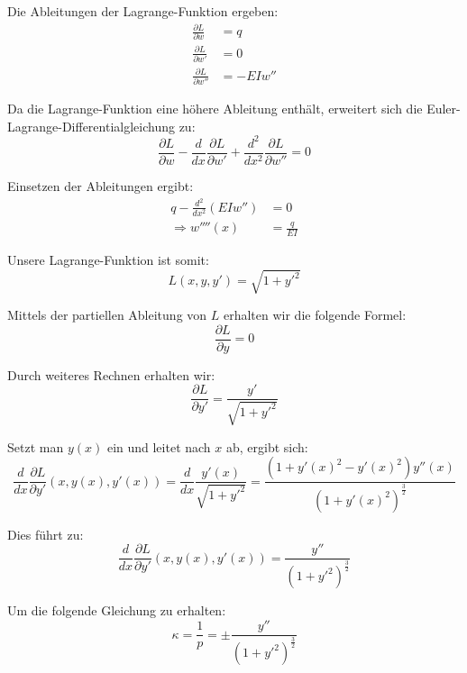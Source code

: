 Die Ableitungen der Lagrange-Funktion ergeben:
\begin{align}
	\frac{\partial L}{\partial w} &= q \\
	\frac{\partial L}{\partial w'} &= 0 \\
	\frac{\partial L}{\partial w''} &= -E I w''
\end{align}

Da die Lagrange-Funktion eine höhere Ableitung enthält, erweitert sich die Euler-Lagrange-Differentialgleichung zu:
\begin{equation}
	\frac{\partial L}{\partial w} - \frac{d}{dx} \frac{\partial L}{\partial w'} + \frac{d^2}{dx^2} \frac{\partial L}{\partial w''} = 0
\end{equation}

Einsetzen der Ableitungen ergibt:
	\begin{align}
		q - \frac{d^2}{dx^2}(E I w'') &= 0 \\
		\Rightarrow w''''(x) &= \frac{q}{E I}
	\end{align}

Unsere Lagrange-Funktion ist somit:
\begin{equation}
	L(x,y,y') = \sqrt{1 + {y'}^2}
\end{equation}

Mittels der partiellen Ableitung von $L$ erhalten wir die folgende Formel:
\begin{equation}
	\frac{\partial L}{\partial y} = 0
\end{equation}

Durch weiteres Rechnen erhalten wir:
\begin{equation}
	\frac{\partial L}{\partial y'} = \frac{y'}{\sqrt{1 + {y'}^2}}
\end{equation}

Setzt man $y(x)$ ein und leitet nach $x$ ab, ergibt sich:
\begin{equation}
	\frac{d}{dx} \frac{\partial L}{\partial y'}(x,y(x),y'(x)) = \frac{d}{dx} \frac{y'(x)}{\sqrt{1 + {y'}^2}} = \frac{(1 + {y'(x)}^2 - {y'(x)}^2) y''(x)}{(1 + {y'(x)}^2)^{\frac{3}{2}}}
\end{equation}

Dies führt zu:
\begin{equation}
	\frac{d}{dx} \frac{\partial L}{\partial y'}(x,y(x),y'(x)) = \frac{y''}{(1 + {y'}^2)^{\frac{3}{2}}}
\end{equation}

Um die folgende Gleichung zu erhalten:
\begin{equation}
	\kappa = \frac{1}{p} = \pm \frac{y''}{(1 + {y'}^2)^{\frac{3}{2}}}
\end{equation}

